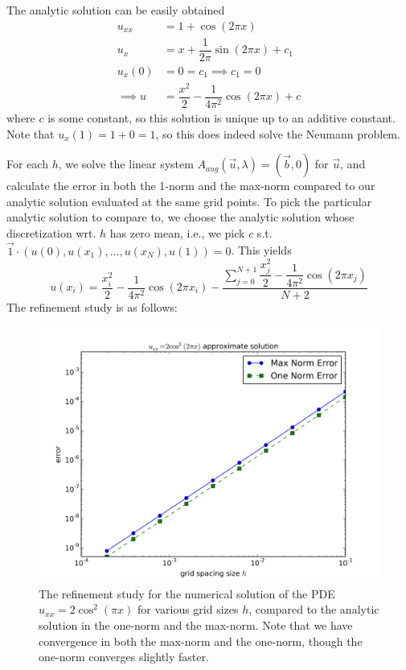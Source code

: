 \documentclass[12pt]{article}
\begin{document}
The analytic solution can be easily obtained
\begin{align*}
u_{xx} &= 1 + \cos(2\pi x) \\
u_x &= x + \dfrac{1}{2\pi} \sin(2 \pi x) + c_1 \\
u_x(0) &= 0 = c_1 \implies c_1 =0 \\
\implies u &= \dfrac{x^2}{2} - \dfrac{1}{4\pi^2} \cos(2 \pi x) + c
\end{align*}
where $c$ is some constant, so this solution is unique up to an additive constant.  Note that $u_x(1) = 1 + 0 = 1$, so this does indeed solve the Neumann problem.

For each $h$, we solve the linear system $A_{aug} (\vec{u}, \lambda) = (\vec{b}, 0)$ for $\vec{u}$, and calculate the error in both the 1-norm and the max-norm compared to our analytic solution evaluated at the same grid points.  To pick the particular analytic solution to compare to, we choose the analytic solution whose discretization wrt. $h$ has zero mean, i.e., we pick $c$ s.t. $\vec{1} \cdot (u(0), u(x_1), \dots, u(x_N), u(1)) = 0$.  This yields 
$$u(x_i) = \dfrac{x_i^2}{2} - \dfrac{1}{4\pi^2} \cos(2\pi x_i) - \dfrac{\sum_{j=0}^{N+1} \dfrac{x_j^2}{2} - \dfrac{1}{4\pi^2} \cos(2 \pi x_j)}{N+2}$$
The refinement study is as follows:
\begin{figure}[H]
\centering\includegraphics[scale=0.5]{problem1b_refinement_study.png}
\caption{The refinement study for the numerical solution of the PDE $u_{xx} = 2\cos^2(\pi x)$ for various grid sizes $h$, compared to the analytic solution in the one-norm and the max-norm. Note that we have convergence in both the max-norm and the one-norm, though the one-norm converges slightly faster.}
\end{figure}
\end{document}
